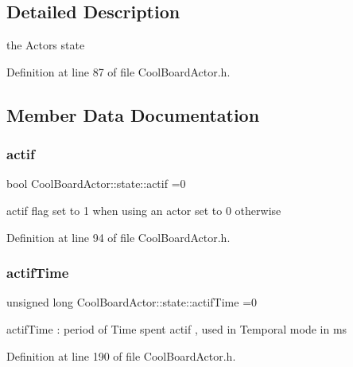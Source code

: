 \subsection{Detailed Description}
the Actor\textquotesingle{}s state 

Definition at line 87 of file Cool\+Board\+Actor.\+h.



\subsection{Member Data Documentation}
\mbox{\label{struct_cool_board_actor_1_1state_a7963178c2de01ef0d2861f9f59ad6f3c}} 
\subsubsection{\texorpdfstring{actif}{actif}}
{\footnotesize\ttfamily bool Cool\+Board\+Actor\+::state\+::actif =0}

actif flag set to 1 when using an actor set to 0 otherwise 

Definition at line 94 of file Cool\+Board\+Actor.\+h.

\mbox{\label{struct_cool_board_actor_1_1state_a534119a22a09b29ecb446b277d5b2ef5}} 
\subsubsection{\texorpdfstring{actif\+Time}{actifTime}}
{\footnotesize\ttfamily unsigned long Cool\+Board\+Actor\+::state\+::actif\+Time =0}

actif\+Time \+: period of Time spent actif , used in Temporal mode in ms 

Definition at line 190 of file Cool\+Board\+Actor.\+h.

\mbox{\label{struct_cool_board_actor_1_1state_acd1af3ac2382258a5b05497d814adc01}} 
